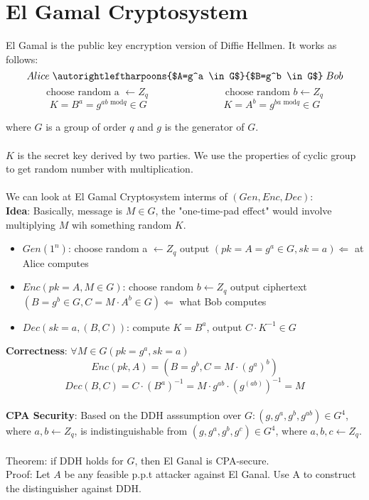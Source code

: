 \documentclass{scribe}
\begin{document}
\vspace{10mm}


\section{El Gamal Cryptosystem}
El Gamal is the public key encryption version of Diffie Hellmen. It works as follows:
$$ Alice \;\autorightleftharpoons{$A=g^a \in G$}{$B=g^b \in G$}\; Bob $$
$$ \text{choose random a }\leftarrow Z_q \;\hspace{3cm}\; \text{choose random }b \leftarrow Z_q $$
$$ K = B^a = g^{ab\text{ mod}q} \in G \;\hspace{3cm}\; K = A^b = g^{ba\text{ mod}q} \in G $$

where $G$ is a group of order $q$ and $g$ is the generator of $G$.
\\\\
$K$  is the secret key derived by two parties. We use the properties of cyclic group to get random number with multiplication.
\\\\
We can look at El Gamal Cryptosystem interms of $(Gen, Enc, Dec):$
\\
\textbf{Idea}: Basically, message is $M \in G$, the "one-time-pad effect" would involve multiplying $M$ wih something random $K$. 
\begin{itemize} 
    \item $Gen(1^n)$: choose random a $\leftarrow Z_q $ output $(pk=A=g^a \in G, sk=a) \Leftarrow$ at Alice computes\\
    \item $Enc(pk=A,M \in G)$: choose random $b \leftarrow Z_q$ output ciphertext $(B = g^b \in G, C = M \cdot A^b \in G) \Leftarrow $ what Bob computes
    \item $Dec(sk=a,(B,C))$: compute $K=B^a$, output $C \cdot K^{-1} \in G$
\end{itemize}
\textbf{Correctness}: $\forall M \in G$\text{, }$(pk=g^a,sk=a)$
\[Enc(pk,A) = (B = g^b, C = M \cdot (g^a)^b)\]
\[Dec(B,C) = C \cdot (B^a)^{-1} = M \cdot g^{ab} \cdot (g^{(ab)})^{-1} = M\]
\vspace{5mm}
\\
\noindent\textbf{CPA Security}: Based on the DDH asssumption over $G: (g,g^a,g^b,g^{ab}) \in G^4$, where $a,b \leftarrow Z_q$, is indistinguishable from $(g,g^a,g^b,g^{c}) \in G^4$, where $a,b,c \leftarrow Z_q$.
\\\\
Theorem: if DDH holds for $G$, then El Ganal is CPA-secure.
\\
Proof: Let $A$ be any feasible p.p.t attacker against El Ganal. Use A to construct the distinguisher against DDH.
\end{document}
